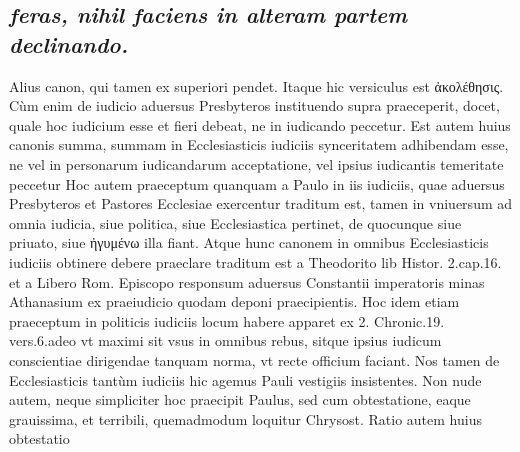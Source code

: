 \documentclass{article}
\begin{document}
\begin{pages}
\subsection*{\textit{feras, nihil faciens in alteram partem declinando. }}\pstart Alius canon, qui tamen ex superiori pendet. Itaque hic versiculus est ἀκολέθησις. Cùm enim de iudicio aduersus Presbyteros instituendo supra praeceperit, docet, quale hoc iudicium esse et fieri debeat, ne in iudicando peccetur.  \pend\pstart Est autem huius canonis summa, summam in Ecclesiasticis iudiciis synceritatem adhibendam esse, ne vel in personarum iudicandarum acceptatione, vel ipsius iudicantis temeritate peccetur Hoc autem praeceptum quanquam a Paulo in iis iudiciis, quae aduersus Presbyteros et Pastores Ecclesiae exercentur traditum est, tamen in vniuersum ad omnia iudicia, siue politica, siue Ecclesiastica pertinet, de quocunque siue priuato, siue ἠγυμένω illa fiant. Atque hunc canonem in omnibus Ecclesiasticis iudiciis obtinere debere praeclare traditum est a Theodorito lib Histor. 2.cap.16. et a Libero Rom. Episcopo responsum aduersus Constantii imperatoris minas Athanasium ex praeiudicio quodam deponi praecipientis. Hoc idem etiam praeceptum in politicis iudiciis locum habere apparet ex 2. Chronic.19. vers.6.adeo vt maximi sit vsus in omnibus rebus, sitque ipsius iudicum conscientiae dirigendae tanquam norma, vt recte officium faciant. Nos tamen de Ecclesiasticis tantùm iudiciis hic agemus Pauli vestigiis insistentes. Non nude autem, neque simpliciter hoc praecipit Paulus, sed cum obtestatione, eaque grauissima, et terribili, quemadmodum loquitur Chrysost. Ratio autem huius obtestatio\pend

\end{pages}
\end{document}
